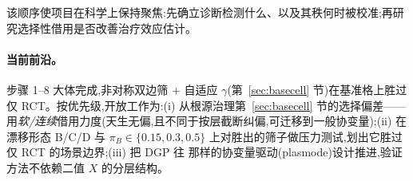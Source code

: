 \documentclass[11pt]{article}
\begin{document}
该顺序使项目在科学上保持聚焦:先确立诊断检测什么、以及其秩何时被校准;再研究选择性借用是否改善治疗效应估计。

\paragraph{当前前沿。}
步骤 1--8 大体完成,非对称双边筛 $+$ 自适应 $\gamma$(第~\ref{sec:basecell} 节)在基准格上胜过仅 RCT。按优先级,开放工作为:(i) 从根源治理第~\ref{sec:basecell} 节的选择偏差——用\emph{软/连续}借用力度(天生无偏,且不同于按层截断纠偏,可迁移到一般协变量);(ii) 在漂移形态 B/C/D 与 $\pi_B\in\{0.15,0.3,0.5\}$ 上对胜出的筛子做压力测试,划出它胜过仅 RCT 的场景边界;(iii) 把 DGP 往 \citet{zhou2025causal} 那样的协变量驱动(plasmode)设计推进,验证方法不依赖二值 $X$ 的分层结构。

\newpage

\end{document}
